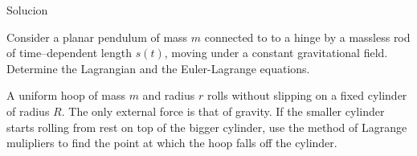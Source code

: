 \documentclass[12pt]{article}
\newenvironment{problem}[2][Problem]{\begin{trivlist}
\item[\hskip \labelsep {\bfseries #1}\hskip \labelsep {\bfseries #2.}]}{\end{trivlist}}
\begin{document}
Solucion
\begin{problem}{4}
Consider a planar pendulum of mass $m$ connected to to a hinge by a massless rod of time–dependent length $s(t)$, moving under a constant gravitational field. Determine the Lagrangian and the Euler-Lagrange equations. 
\begin{center}
\end{center}
\end{problem}

\begin{problem}{5} 
A uniform hoop of mass $m$ and radius $r$ rolls without slipping on a fixed cylinder of radius $R$. The only external force is that of gravity. If the smaller cylinder starts rolling from rest on top of the bigger cylinder, use the method of Lagrange mulipliers to find the point at which the hoop falls off the cylinder.
\begin{center}
\end{center}
\end{problem}

 
\end{document}

